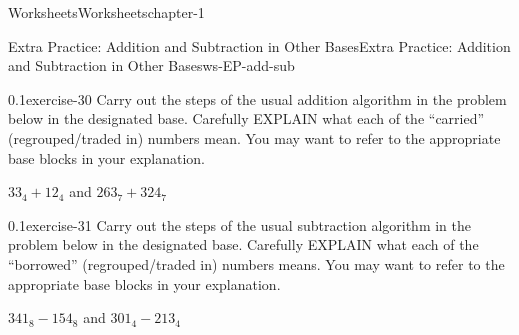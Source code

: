 \documentclass[twoside,11pt,]{book}
\begin{document}
\begin{chapterptx}{Worksheets}{}{Worksheets}{}{}{chapter-1}
\typeout{************************************************}
%
\begin{worksheet-section-numberless}{Extra Practice: Addition and Subtraction in Other Bases}{}{Extra Practice: Addition and Subtraction in Other Bases}{}{}{ws-EP-add-sub}
\begin{divisionexercise}{1}{}{0.1}{exercise-30}%
\hypertarget{p-51}{}%
Carry out the steps of the usual addition algorithm in the problem below in the designated base.  Carefully EXPLAIN what each of the “carried” (regrouped\slash{}traded in) numbers mean.  You may want to refer to the appropriate base blocks in your explanation.%
\par
\hypertarget{p-52}{}%
\(33_4+12_4\) and \(263_7+324_7\)%
\end{divisionexercise}%
\begin{divisionexercise}{2}{}{0.1}{exercise-31}%
\hypertarget{p-53}{}%
Carry out the steps of the usual subtraction algorithm in the problem below in the designated base.  Carefully EXPLAIN what each of the “borrowed” (regrouped\slash{}traded in) numbers means.  You may want to refer to the appropriate base blocks in your explanation.%
\par
\hypertarget{p-54}{}%
\(341_8 - 154_8 \) and \(301_4 -213_4\)%
\end{divisionexercise}%
\end{worksheet-section-numberless}
\restoregeometry
\end{chapterptx}
\end{document}
